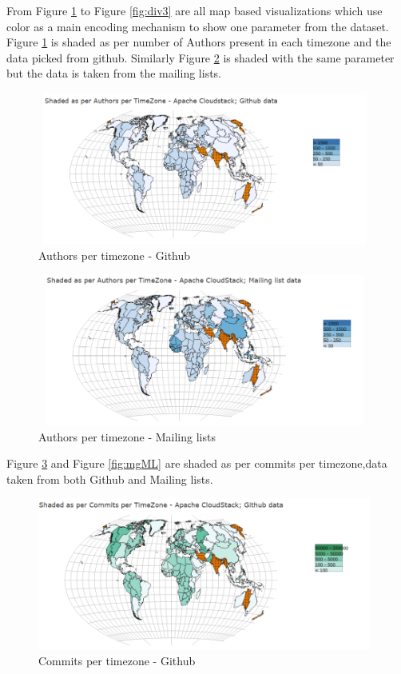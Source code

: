 \documentclass[seploa]{beavtex}
\begin{document}
From Figure \ref{fig:auHub} to Figure \ref{fig:div3} are all map based visualizations which use color as a main encoding mechanism to show one parameter from the dataset. Figure \ref{fig:auHub} is shaded as per number of Authors present in each timezone and the data picked from github. Similarly Figure \ref{fig:auML} is shaded with the same parameter but the data is taken from the mailing lists.

\begin{figure}[H]
\centering
\includegraphics[width=110mm,height=50mm]{image4.PNG}
\caption{Authors per timezone - Github}
\label{fig:auHub}
\end{figure}

\begin{figure}[H]
\centering
\includegraphics[width=110mm,height=50mm]{image5.PNG}
\caption{Authors per timezone - Mailing lists}
\label{fig:auML}
\end{figure}

Figure \ref{fig:coHub} and Figure \ref{fig:mgML} are shaded as per commits per timezone,data taken from both Github and Mailing lists.

\begin{figure}[H]
\centering
\includegraphics[width=110mm,height=50mm]{image6.PNG}
\caption{Commits per timezone - Github}
\label{fig:coHub}
\end{figure}
\end{document}
